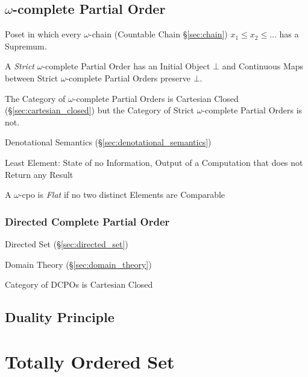 \subsection{$\omega$-complete Partial Order}\label{sec:omega_cpo}

Poset in which every $\omega$-chain (Countable Chain
\S\ref{sec:chain}) $x_1 \leq x_2 \leq \ldots$ has a Supremum.

A \emph{Strict} $\omega$-complete Partial Order has an Initial Object
$\bot$ and Continuous Maps between Strict $\omega$-complete Partial
Orders preserve $\bot$.

The Category of $\omega$-complete Partial Orders is Cartesian Closed
(\S\ref{sec:cartesian_closed}) but the Category of Strict
$\omega$-complete Partial Orders is not.

Denotational Semantics (\S\ref{sec:denotational_semantics})

Least Element: State of no Information, Output of a Computation that
does not Return any Result

A $\omega$-cpo is \emph{Flat} if no two distinct Elements are
Comparable



\subsubsection{Directed Complete Partial Order}\label{sec:dcpo}

Directed Set (\S\ref{sec:directed_set})

Domain Theory (\S\ref{sec:domain_theory})

Category of DCPOs is Cartesian Closed



\subsection{Duality Principle}\label{sec:duality_principle}



\section{Totally Ordered Set}\label{sec:totally_ordered}


